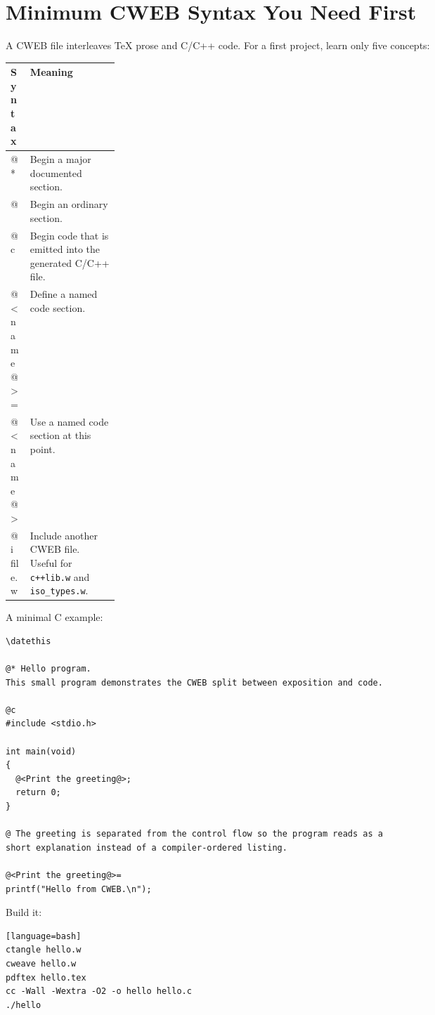 \documentclass[11pt]{article}
\begin{document}

\section{Minimum CWEB Syntax You Need First}

A CWEB file interleaves TeX prose and C/C++ code. For a first project, learn only five concepts:

\begin{center}
\begin{tabularx}{0.96\linewidth}{>{\ttfamily}p{0.18\linewidth} X}
\toprule
\normalfont\textbf{Syntax} & \textbf{Meaning} \\
\midrule
@* & Begin a major documented section. \\
@ & Begin an ordinary section. \\
@c & Begin code that is emitted into the generated C/C++ file. \\
@<name@>= & Define a named code section. \\
@<name@> & Use a named code section at this point. \\
@i file.w & Include another CWEB file. Useful for \texttt{c++lib.w} and \texttt{iso\_types.w}. \\
\bottomrule
\end{tabularx}
\end{center}

A minimal C example:

\begin{verbatim}
\datethis

@* Hello program.
This small program demonstrates the CWEB split between exposition and code.

@c
#include <stdio.h>

int main(void)
{
  @<Print the greeting@>;
  return 0;
}

@ The greeting is separated from the control flow so the program reads as a
short explanation instead of a compiler-ordered listing.

@<Print the greeting@>=
printf("Hello from CWEB.\n");
\end{verbatim}

Build it:

\begin{verbatim}[language=bash]
ctangle hello.w
cweave hello.w
pdftex hello.tex
cc -Wall -Wextra -O2 -o hello hello.c
./hello
\end{verbatim}
\end{document}
